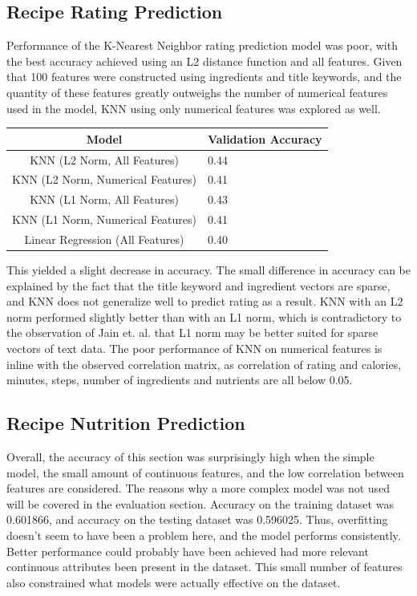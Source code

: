 \documentclass[sigconf]{acmart}
\begin{document}
\subsection{Recipe Rating Prediction}
Performance of the K-Nearest Neighbor rating prediction model was poor, with the best accuracy achieved using an L2 distance function and all features. Given that 100 features were constructed using ingredients and title keywords, and the quantity of these features greatly outweighs the number of numerical features used in the model, KNN using only numerical features was explored as well.


\begin{table}[h]
\begin{tabular}{|c|p{3cm}|}
     \hline Model & Validation Accuracy  \\
     \hline KNN (L2 Norm, All Features) & 0.44 \\
     \hline KNN (L2 Norm, Numerical Features) & 0.41 \\
     \hline KNN (L1 Norm, All Features) & 0.43 \\
     \hline KNN (L1 Norm, Numerical Features) & 0.41 \\
     \hline Linear Regression (All Features) & 0.40 \\
     \hline 
\end{tabular}
\end{table}

This yielded a slight decrease in accuracy. The small difference in accuracy can be explained by the fact that the title keyword and ingredient vectors are sparse, and KNN does not generalize well to predict rating as a result. KNN with an L2 norm performed slightly better than with an L1 norm, which is contradictory to the observation of  Jain et. al. that L1 norm may be better suited for sparse vectors of text data. The poor performance of KNN on numerical features is inline with the observed correlation matrix, as correlation of rating and calories, minutes, steps, number of ingredients and nutrients are all below 0.05.

\subsection{Recipe Nutrition Prediction}
Overall, the accuracy of this section was surprisingly high when the simple model, the small amount of continuous features, and the low correlation between features are considered. The reasons why a more complex model was not used will be covered in the evaluation section.
Accuracy on the training dataset was 0.601866, and accuracy on the testing dataset was 0.596025. Thus, overfitting doesn't seem to have been a problem here, and the model performs consistently. Better performance could probably have been achieved had more relevant continuous attributes been present in the dataset. This small number of features also constrained what models were actually effective on the dataset.
\end{document}
